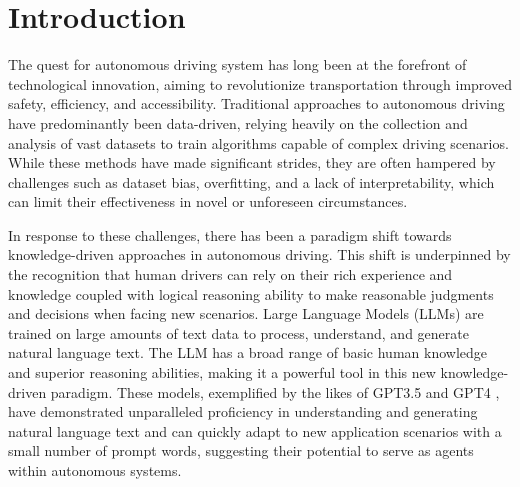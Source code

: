\documentclass[lettersize,journal]{IEEEtran}
\begin{document}
\section{Introduction}
The quest for autonomous driving system has long been at the forefront of technological innovation, aiming to revolutionize transportation through improved safety, efficiency, and accessibility. Traditional approaches to autonomous driving have predominantly been data-driven\cite{amini2020learning,xu2020data,bogdoll2021description,chen2023milestones}, relying heavily on the collection and analysis of vast datasets to train algorithms capable of complex driving scenarios. While these methods have made significant strides, they are often hampered by challenges such as dataset bias\cite{jaipuria2020deflating}, overfitting\cite{ying2019overview,hawkins2004problem}, and a lack of interpretability\cite{zhang2021survey,gilpin2018explaining}, which can limit their effectiveness in novel or unforeseen circumstances.

In response to these challenges, there has been a paradigm shift towards knowledge-driven approaches in autonomous driving\cite{wendilu,li2023towards}. This shift is underpinned by the recognition that human drivers can rely on their rich experience and knowledge coupled with logical reasoning ability to make reasonable judgments and decisions when facing new scenarios. Large Language Models (LLMs) are trained on large amounts of text data to process, understand, and generate natural language text. The LLM has a broad range of basic human knowledge and superior reasoning abilities, making it a powerful tool in this new knowledge-driven paradigm\cite{touvron2023llama,achiam2023gpt}. These models, exemplified by the likes of GPT3.5 and GPT4\cite{achiam2023gpt} , have demonstrated unparalleled proficiency in understanding and generating natural language text and can quickly adapt to new application scenarios with a small number of prompt words, suggesting their potential to serve as agents within autonomous systems\cite{song2023llm,mai2023llm,pan2023context}. 
\end{document}
